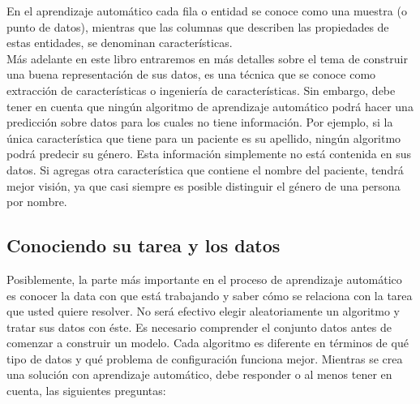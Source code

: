 

En el aprendizaje automático cada  fila o entidad se conoce como una muestra (o punto de datos),   mientras que las columnas  que describen las propiedades de estas entidades, se denominan características.\\


Más adelante en este libro entraremos en más detalles sobre el tema de construir una buena representación   de sus datos, es una técnica que se conoce como extracción de características o ingeniería de características.  Sin embargo, debe tener en cuenta que ningún algoritmo de aprendizaje automático podrá hacer una predicción sobre datos para los cuales no tiene información.     Por ejemplo, si la única característica que tiene para un paciente es su apellido, ningún algoritmo podrá predecir su género.  Esta información simplemente no está contenida en sus datos. Si agregas otra característica que contiene el nombre del paciente, tendrá  mejor visión, ya que casi siempre  es posible distinguir el género de una persona por nombre.




\subsection{Conociendo su tarea y los datos}


Posiblemente, la parte más importante en el proceso de aprendizaje automático es
conocer la data con que está trabajando y saber cómo se relaciona con la tarea que usted quiere resolver. No será efectivo elegir aleatoriamente un algoritmo y tratar sus datos con éste. Es necesario comprender  el conjunto datos antes de comenzar a construir un modelo. Cada algoritmo es diferente en términos de qué tipo de datos y qué problema de configuración funciona mejor. Mientras se crea una solución con aprendizaje automático, debe responder o al menos tener en cuenta, las siguientes preguntas:\\

 
